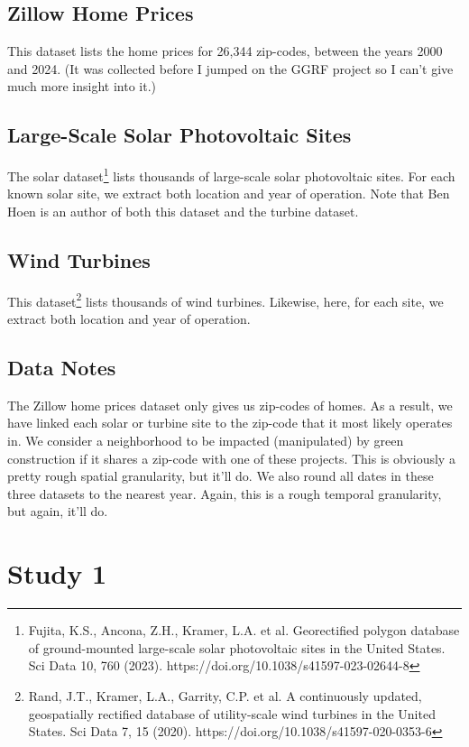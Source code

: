 \documentclass{article}
\begin{document}
\subsection{Zillow Home Prices}
This dataset lists the home prices for 26,344 zip-codes, between the years 2000 and 2024.
(It was collected before I jumped on the GGRF project so I can't give much more insight into it.)

\subsection{Large-Scale Solar Photovoltaic Sites}
The solar dataset\footnote{Fujita, K.S., Ancona, Z.H., Kramer, L.A. et al. Georectified polygon database of ground-mounted large-scale solar photovoltaic sites in the United States. Sci Data 10, 760 (2023). https://doi.org/10.1038/s41597-023-02644-8} lists thousands of large-scale solar photovoltaic sites.
For each known solar site, we extract both location and year of operation.
Note that Ben Hoen is an author of both this dataset and the turbine dataset.

\subsection{Wind Turbines}
This dataset\footnote{
Rand, J.T., Kramer, L.A., Garrity, C.P. et al. A continuously updated, geospatially rectified database of utility-scale wind turbines in the United States. Sci Data 7, 15 (2020). https://doi.org/10.1038/s41597-020-0353-6} lists thousands of wind turbines.
Likewise, here, for each site, we extract both location and year of operation.

\subsection{Data Notes}
The Zillow home prices dataset only gives us zip-codes of homes.
As a result, we have linked each solar or turbine site to the zip-code that it most likely operates in.
We consider a neighborhood to be impacted (manipulated) by green construction if it shares a zip-code with one of these projects.
This is obviously a pretty rough spatial granularity, but it'll do.
We also round all dates in these three datasets to the nearest year.
Again, this is a rough temporal granularity, but again, it'll do.

\section{Study 1}
\end{document}
